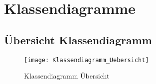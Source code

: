 
\chapter{Klassendiagramme}
\section{Übersicht Klassendiagramm}

\begin{figure}[ht]
	\centering
	\texttt{[image: Klassendiagramm\_Uebersicht]}
	\caption{Klassendiagramm Übersicht}
\end{figure}

%
%
%
%
%
%
%
%
%
